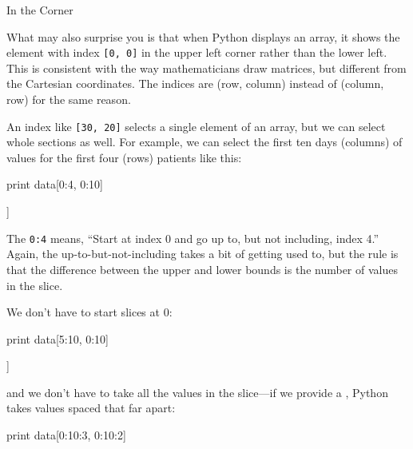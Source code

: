 \begin{swcbox}{In the Corner}

What may also surprise you is that when Python displays an array, it
shows the element with index \texttt{{[}0, 0{]}} in the upper left
corner rather than the lower left. This is consistent with the way
mathematicians draw matrices, but different from the Cartesian
coordinates. The indices are (row, column) instead of (column, row) for
the same reason.

\end{swcbox}

An index like \texttt{{[}30, 20{]}} selects a single element of an
array, but we can select whole sections as well. For example, we can
select the first ten days (columns) of values for the first four (rows)
patients like this:

\begin{VerbIn}
print data[0:4, 0:10]
\end{VerbIn}

\begin{VerbOut}
[[ 0.  0.  1.  3.  1.  2.  4.  7.  8.  3.]
 [ 0.  1.  2.  1.  2.  1.  3.  2.  2.  6.]
 [ 0.  1.  1.  3.  3.  2.  6.  2.  5.  9.]
 [ 0.  0.  2.  0.  4.  2.  2.  1.  6.  7.]]
\end{VerbOut}

The  \texttt{0:4} means, ``Start at index 0 and
go up to, but not including, index 4.'' Again, the
up-to-but-not-including takes a bit of getting used to, but the rule is
that the difference between the upper and lower bounds is the number of
values in the slice.

We don't have to start slices at 0:

\begin{VerbIn}
print data[5:10, 0:10]
\end{VerbIn}

\begin{VerbOut}
[[ 0.  0.  1.  2.  2.  4.  2.  1.  6.  4.]
 [ 0.  0.  2.  2.  4.  2.  2.  5.  5.  8.]
 [ 0.  0.  1.  2.  3.  1.  2.  3.  5.  3.]
 [ 0.  0.  0.  3.  1.  5.  6.  5.  5.  8.]
 [ 0.  1.  1.  2.  1.  3.  5.  3.  5.  8.]]
\end{VerbOut}

and we don't have to take all the values in the slice---if we provide a
, Python takes values spaced that far apart:

\begin{VerbIn}
print data[0:10:3, 0:10:2]
\end{VerbIn}

